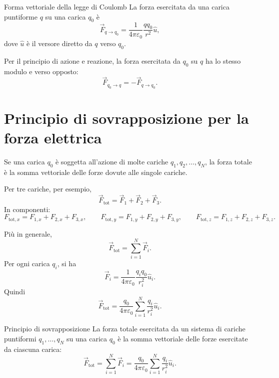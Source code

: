 \documentclass[a4paper]{article}
\begin{document}
\begin{snippetproposition}{Forma vettoriale della legge di Coulomb}
    La forza esercitata da una carica puntiforme \(q\) su una carica \(q_0\) è
    \[
        \vec{F}_{q\to q_0}=\frac{1}{4\pi\varepsilon_0}\frac{qq_0}{r^2}\hat{u},
    \]
    dove \(\hat{u}\) è il versore diretto da \(q\) verso \(q_0\).
\end{snippetproposition}

Per il principio di azione e reazione, la forza esercitata da \(q_0\) su \(q\) ha lo stesso modulo e verso opposto:
\[
    \vec{F}_{q_0\to q}=-\vec{F}_{q\to q_0}.
\]

\section{Principio di sovrapposizione per la forza elettrica}

Se una carica \(q_0\) è soggetta all'azione di molte cariche \(q_1,q_2,\dots,q_N\), la forza totale è la somma vettoriale delle forze dovute alle singole cariche.

Per tre cariche, per esempio,
\[
    \vec{F}_{\mathrm{tot}}=\vec{F}_1+\vec{F}_2+\vec{F}_3.
\]
In componenti:
\[
    F_{\mathrm{tot},x}=F_{1,x}+F_{2,x}+F_{3,x},
    \qquad
    F_{\mathrm{tot},y}=F_{1,y}+F_{2,y}+F_{3,y},
    \qquad
    F_{\mathrm{tot},z}=F_{1,z}+F_{2,z}+F_{3,z}.
\]

Più in generale,
\[
    \vec{F}_{\mathrm{tot}}=\sum_{i=1}^N\vec{F}_i.
\]
Per ogni carica \(q_i\), si ha
\[
    \vec{F}_i=\frac{1}{4\pi\varepsilon_0}\frac{q_iq_0}{r_i^2}\hat{u}_i.
\]
Quindi
\[
    \vec{F}_{\mathrm{tot}}
    =\frac{q_0}{4\pi\varepsilon_0}\sum_{i=1}^N\frac{q_i}{r_i^2}\hat{u}_i.
\]

\begin{snippettheorem}{Principio di sovrapposizione}
    La forza totale esercitata da un sistema di cariche puntiformi \(q_1,\dots,q_N\) su una carica \(q_0\) è la somma vettoriale delle forze esercitate da ciascuna carica:
    \[
        \vec{F}_{\mathrm{tot}}=\sum_{i=1}^N\vec{F}_i
        =\frac{q_0}{4\pi\varepsilon_0}\sum_{i=1}^N\frac{q_i}{r_i^2}\hat{u}_i.
    \]
\end{snippettheorem}
\end{document}
